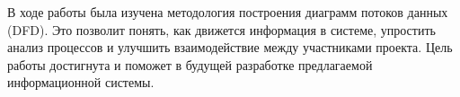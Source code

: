 В ходе работы была изучена методология построения диаграмм потоков данных (DFD).
Это позволит понять, как движется информация в системе, упростить анализ
процессов и улучшить взаимодействие между участниками проекта. Цель работы
достигнута и поможет в будущей разработке предлагаемой информационной системы.
